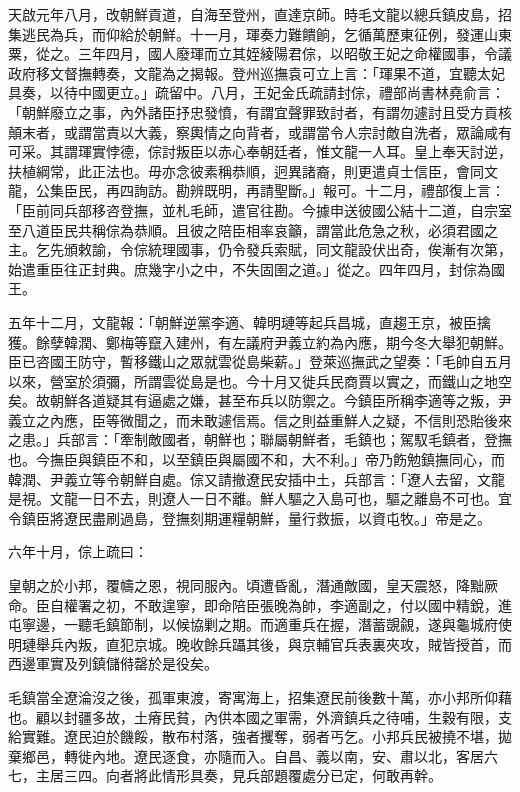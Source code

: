 \begin{pinyinscope}
天啟元年八月，改朝鮮貢道，自海至登州，直達京師。時毛文龍以總兵鎮皮島，招集逃民為兵，而仰給於朝鮮。十一月，琿奏力難饋餉，乞循萬歷東征例，發運山東粟，從之。三年四月，國人廢琿而立其姪綾陽君倧，以昭敬王妃之命權國事，令議政府移文督撫轉奏，文龍為之揭報。登州巡撫袁可立上言：「琿果不道，宜聽太妃具奏，以待中國更立。」疏留中。八月，王妃金氏疏請封倧，禮部尚書林堯俞言：「朝鮮廢立之事，內外諸臣抒忠發憤，有謂宜聲罪致討者，有謂勿遽討且受方貢核顛末者，或謂當責以大義，察輿情之向背者，或謂當令人宗討敵自洗者，眾論咸有可采。其謂琿實悖德，倧討叛臣以赤心奉朝廷者，惟文龍一人耳。皇上奉天討逆，扶植綱常，此正法也。毋亦念彼素稱恭順，迥異諸裔，則更遣貞士信臣，會同文龍，公集臣民，再四詢訪。勘辨既明，再請聖斷。」報可。十二月，禮部復上言：「臣前同兵部移咨登撫，並札毛師，遣官往勘。今據申送彼國公結十二道，自宗室至八道臣民共稱倧為恭順。且彼之陪臣相率哀籲，謂當此危急之秋，必須君國之主。乞先頒敕諭，令倧統理國事，仍令發兵索賦，同文龍設伏出奇，俟漸有次第，始遣重臣往正封典。庶幾字小之中，不失固圉之道。」從之。四年四月，封倧為國王。

五年十二月，文龍報：「朝鮮逆黨李適、韓明璉等起兵昌城，直趨王京，被臣擒獲。餘孽韓潤、鄭梅等竄入建州，有左議府尹義立約為內應，期今冬大舉犯朝鮮。臣已咨國王防守，暫移鐵山之眾就雲從島柴薪。」登萊巡撫武之望奏：「毛帥自五月以來，營室於須彌，所謂雲從島是也。今十月又徙兵民商賈以實之，而鐵山之地空矣。故朝鮮各道疑其有逼處之嫌，甚至布兵以防禦之。今鎮臣所稱李適等之叛，尹義立之內應，臣等微聞之，而未敢遽信焉。信之則益重鮮人之疑，不信則恐貽後來之患。」兵部言：「牽制敵國者，朝鮮也；聯屬朝鮮者，毛鎮也；駕馭毛鎮者，登撫也。今撫臣與鎮臣不和，以至鎮臣與屬國不和，大不利。」帝乃飭勉鎮撫同心，而韓潤、尹義立等令朝鮮自處。倧又請撤遼民安插中土，兵部言：「遼人去留，文龍是視。文龍一日不去，則遼人一日不離。鮮人驅之入島可也，驅之離島不可也。宜令鎮臣將遼民盡刷過島，登撫刻期運糧朝鮮，量行救振，以資屯牧。」帝是之。

六年十月，倧上疏曰：

皇朝之於小邦，覆幬之恩，視同服內。頃遭昏亂，潛通敵國，皇天震怒，降黜厥命。臣自權署之初，不敢遑寧，即命陪臣張晚為帥，李適副之，付以國中精銳，進屯寧邊，一聽毛鎮節制，以候協剿之期。而適重兵在握，潛蓄覬覦，遂與龜城府使明璉舉兵內叛，直犯京城。晚收餘兵躡其後，與京輔官兵表裏夾攻，賊皆授首，而西邊軍實及列鎮儲偫罄於是役矣。

毛鎮當全遼淪沒之後，孤軍東渡，寄寓海上，招集遼民前後數十萬，亦小邦所仰藉也。顧以封疆多故，土瘠民貧，內供本國之軍需，外濟鎮兵之待哺，生穀有限，支給實難。遼民迫於饑餒，散布村落，強者攫奪，弱者丐乞。小邦兵民被撓不堪，拋棄鄉邑，轉徙內地。遼民逐食，亦隨而入。自昌、義以南，安、肅以北，客居六七，主居三四。向者將此情形具奏，見兵部題覆處分已定，何敢再幹。


\end{pinyinscope}
